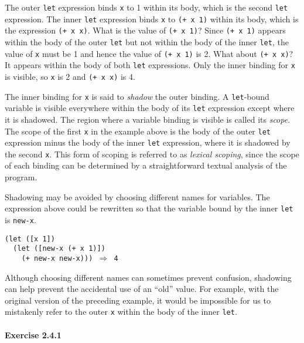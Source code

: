 The outer \texttt{let} expression binds \texttt{x} to 1 within its
body, which is the second \texttt{let} expression.
The inner \texttt{let} expression binds \texttt{x} to \texttt{(+ x 1)} within
its body, which is the expression \texttt{(+ x x)}.
What is the value of \texttt{(+ x 1)}?
Since \texttt{(+ x 1)} appears within the body of the outer \texttt{let}
but not within the body of the inner \texttt{let}, the value of \texttt{x}
must be 1 and hence the value of \texttt{(+ x 1)} is 2.
What about \texttt{(+ x x)}?
It appears within the body of both \texttt{let} expressions.
Only the inner binding for \texttt{x} is visible, so \texttt{x} is 2
and \texttt{(+ x x)} is 4.



\label{start_s54}The inner binding for \texttt{x} is said to \textit{shadow} the
outer binding.
A \texttt{let}-bound variable is visible everywhere within the body of its
\texttt{let} expression except where it is shadowed.
The region where a variable binding is visible is called its
\label{start_s55}\textit{scope}.
The scope of the first \texttt{x} in the example above is the body of
the outer \texttt{let} expression minus the body of the inner \texttt{let}
expression, where it is shadowed by the second \texttt{x}.
This form of scoping is referred to as \label{start_s56}\textit{lexical scoping},
since the scope of each binding can be determined by a straightforward
textual analysis of the program.



Shadowing may be avoided by choosing different names
for variables.
The expression above could be rewritten so that the variable bound
by the inner \texttt{let} is \texttt{new-x}.


\begin{alltt}
(let ([x 1])
  (let ([new-x (+ x 1)])
    (+ new-x new-x))) \(\Rightarrow\) 4
\end{alltt}


Although choosing different names can sometimes prevent confusion,
shadowing can help prevent the accidental use of an
``old'' value.
For example, with the original version of the preceding example,
it would be impossible for us to mistakenly refer to the outer \texttt{x}
within the body of the inner \texttt{let}.


\paragraph{Exercise \label{start_g18}2.4.1}


